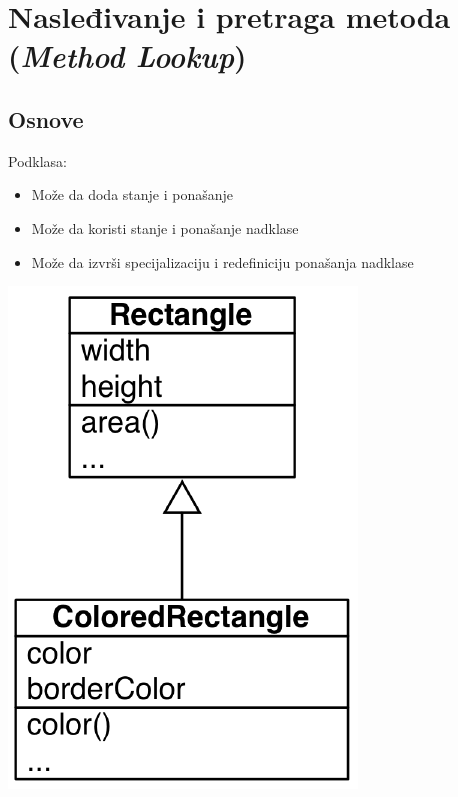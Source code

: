 \documentclass[presentation]{beamer}
\begin{document}
\section{Nasleđivanje i pretraga metoda (\emph{Method Lookup})}
\label{sec:org4eb4e6f}
\subsection{Osnove}
\label{sec:orgca9e877}

Podklasa:
\begin{itemize}
\item Može da doda stanje i ponašanje
\item Može da koristi stanje i ponašanje nadklase
\item Može da izvrši specijalizaciju i redefiniciju ponašanja nadklase
\end{itemize}
\begin{center}
\includegraphics[width=.9\linewidth]{./slike/inheritance.png}
\end{center}
\end{document}
